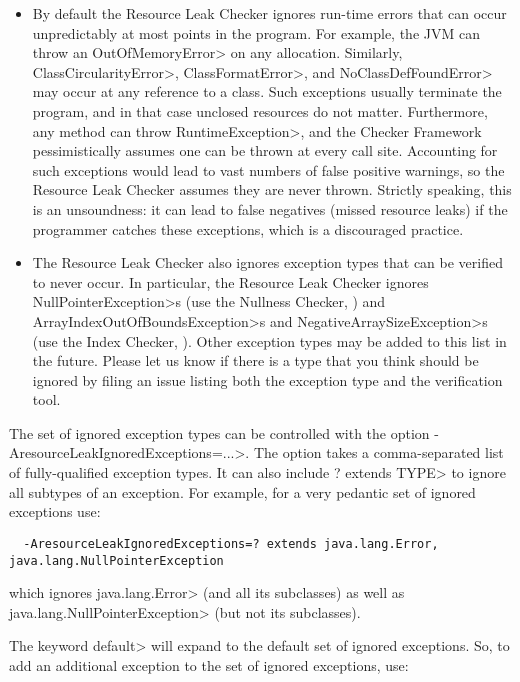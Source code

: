 \begin{itemize}
\item
By default the Resource Leak Checker ignores run-time errors that can occur
unpredictably at most points in the program. For example, the JVM can throw
an \<OutOfMemoryError> on any allocation.  Similarly,
\<ClassCircularityError>, \<ClassFormatError>, and \<NoClassDefFoundError>
may occur at any reference to a class.  Such exceptions usually terminate
the program, and in that case unclosed resources do not matter.
Furthermore, any method can throw \<RuntimeException>, and the Checker
Framework pessimistically assumes one can be thrown at every call site.
Accounting for such exceptions would lead to vast numbers of
false positive warnings, so the Resource Leak Checker assumes they are
never thrown.  Strictly speaking, this is an unsoundness:  it can lead to
false negatives (missed resource leaks) if the programmer catches these
exceptions, which is a discouraged practice.

\item
The Resource Leak Checker also ignores exception types that can be verified
to never occur.  In particular, the Resource Leak Checker ignores \<NullPointerException>s
(use the Nullness Checker, ) and
\<ArrayIndexOutOfBoundsException>s and \<NegativeArraySizeException>s (use the Index
Checker, ). Other exception types may be added to this
list in the future.  Please let us know if there is a type that you think should
be ignored by filing an issue listing both the exception type and the
verification tool.
\end{itemize}

The set of ignored exception types can be controlled with the option
\<-AresourceLeakIgnoredExceptions=...>.  The option takes a comma-separated list of
fully-qualified exception types.  It can also include \<? extends TYPE> to ignore all
subtypes of an exception.  For example, for a very pedantic set of ignored exceptions use:

\begin{verbatim}
  -AresourceLeakIgnoredExceptions=? extends java.lang.Error, java.lang.NullPointerException
\end{verbatim}

which ignores \<java.lang.Error> (and all its subclasses) as well as
\<java.lang.NullPointerException> (but not its subclasses).

The keyword \<default> will expand to the default set of ignored exceptions.  So,
to add an additional exception to the set of ignored exceptions, use:

